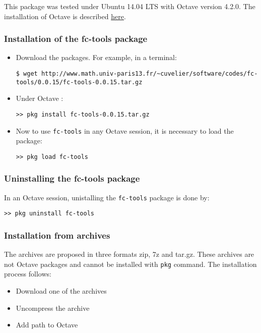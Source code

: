 This package was tested under Ubuntu 14.04 LTS with Octave version 4.2.0. The installation of Octave is described 
\href{http://www.math.univ-paris13.fr/~cuvelier/Octave.html}{here}.

\subsubsection{Installation of the fc-tools package}

\begin{itemize}
\item Download the packages. For example, in a terminal:
\begin{verbatim}
$ wget http://www.math.univ-paris13.fr/~cuvelier/software/codes/fc-tools/0.0.15/fc-tools-0.0.15.tar.gz
\end{verbatim}
\item Under Octave :
\begin{verbatim}
>> pkg install fc-tools-0.0.15.tar.gz
\end{verbatim}
\item Now to use \texttt{fc-tools} in any Octave session, it is necessary to load the package:
\begin{verbatim}
>> pkg load fc-tools
\end{verbatim}
\end{itemize}

\subsubsection{Uninstalling the fc-tools package}
In an Octave session, unistalling the \texttt{fc-tools} package is done by:
\begin{verbatim}
>> pkg uninstall fc-tools
\end{verbatim}

\subsubsection{Installation from archives}
The archives are proposed in three formats zip, 7z and tar.gz. These archives are not Octave packages and cannot be installed with \texttt{pkg} command.
The installation process follows:
\begin{itemize}
\item Download one of the archives
\item Uncompress the archive
\item Add path to Octave
\end{itemize}

